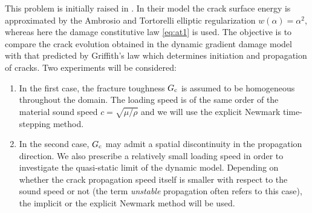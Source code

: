 This problem is initially raised in \cite{Bourdin:2011}. In their model the crack surface energy is approximated by the Ambrosio and Tortorelli elliptic regularization $w(\alpha)=\alpha^2$, whereas here the damage constitutive law \eqref{eq:at1} is used. The objective is to compare the crack evolution obtained in the dynamic gradient damage model with that predicted by Griffith's law which determines initiation and propagation of cracks. Two experiments will be considered:
\begin{enumerate}
\item In the first case, the fracture toughness $G_\mathrm{c}$ is assumed to be homogeneous throughout the domain. The loading speed is of the same order of the material sound speed $c=\sqrt{\mu/\rho}$ and we will use the explicit Newmark time-stepping method.
\item In the second case, $G_\mathrm{c}$ may admit a spatial discontinuity in the propagation direction. We also prescribe a relatively small loading speed in order to investigate the quasi-static limit of the dynamic model. Depending on whether the crack propagation speed itself is smaller with respect to the sound speed or not (the term \emph{unstable} propagation often refers to this case), the implicit or the explicit Newmark method will be used.
\end{enumerate}

